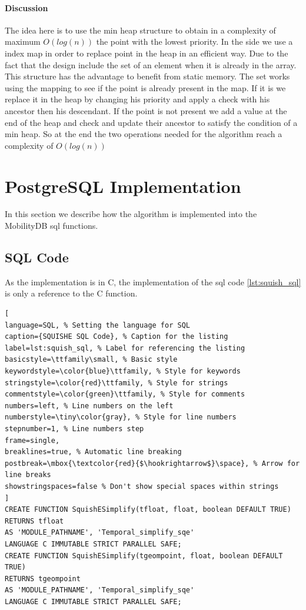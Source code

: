 \paragraph{Discussion}

The idea here is to use the min heap structure to obtain in a complexity of maximum $O(log(n))$  the point with the lowest priority. In the side we use a index map in order to replace point in the heap in an efficient way. Due to the fact that the design include the set of an element when it is already in the array. This structure has the advantage to benefit from static memory. The set works using the mapping to see if the point is already present in the map. If it is we replace it in the heap by changing his priority and apply a check with his ancestor then his descendant. If the point is not present we add a value at the end of the heap and check and update their ancestor to satisfy the condition of a min heap. So at the end the two operations needed for the algorithm reach a complexity of $O(log(n))$

\section{PostgreSQL Implementation}

In this section we describe how the algorithm is implemented into the MobilityDB sql functions.
\subsection{SQL Code}
As the implementation is in C, the implementation of the sql code \ref{lst:squish_sql} is only a reference to the C function.\\

\begin{minipage}{\linewidth}
\begin{lstlisting}[
language=SQL, % Setting the language for SQL
caption={SQUISHE SQL Code}, % Caption for the listing
label=lst:squish_sql, % Label for referencing the listing
basicstyle=\ttfamily\small, % Basic style
keywordstyle=\color{blue}\ttfamily, % Style for keywords
stringstyle=\color{red}\ttfamily, % Style for strings
commentstyle=\color{green}\ttfamily, % Style for comments
numbers=left, % Line numbers on the left
numberstyle=\tiny\color{gray}, % Style for line numbers
stepnumber=1, % Line numbers step
frame=single,
breaklines=true, % Automatic line breaking
postbreak=\mbox{\textcolor{red}{$\hookrightarrow$}\space}, % Arrow for line breaks
showstringspaces=false % Don't show special spaces within strings
]
CREATE FUNCTION SquishESimplify(tfloat, float, boolean DEFAULT TRUE)
RETURNS tfloat
AS 'MODULE_PATHNAME', 'Temporal_simplify_sqe'
LANGUAGE C IMMUTABLE STRICT PARALLEL SAFE;
CREATE FUNCTION SquishESimplify(tgeompoint, float, boolean DEFAULT TRUE)
RETURNS tgeompoint
AS 'MODULE_PATHNAME', 'Temporal_simplify_sqe'
LANGUAGE C IMMUTABLE STRICT PARALLEL SAFE;
\end{lstlisting}
\end{minipage}

